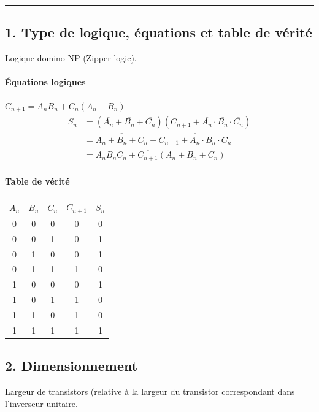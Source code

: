 \documentclass[frenchb,DIV=14]{scrartcl}
\begin{document}
\hspace{1cm}\hrule

\subsection*{1. Type de logique, équations et table de vérité}

Logique domino NP (Zipper logic).

\paragraph{Équations logiques}
$C_{n+1} = A_n B_n + C_n (A_n + B_n)$
\begin{align*}
    S_n &= \overline{(\overline{A_n} + \overline{B_n} + \overline{C_n})(C_{n+1} + \overline{A_n}\cdot\overline{B_n}\cdot\overline{C_n})} \\
    &=  \overline{\overline{A_n}+\overline{B_n}+\overline{C_n}} + \overline{C_{n+1} + \overline{A_n}\cdot\overline{B_n}\cdot\overline{C_n}} \\
    &= A_n B_n C_n + \overline{C_{n+1}}(A_n+B_n+C_n)
\end{align*}

\paragraph{Table de vérité}

\begin{center}
    \begin{tabular}{ccc|cc}
        $A_n$&$B_n$&$C_n$&$C_{n+1}$&$S_n$\\
        \hline
        0&0&0&0&0\\
        0&0&1&0&1\\
        0&1&0&0&1\\
        0&1&1&1&0\\
        1&0&0&0&1\\
        1&0&1&1&0\\
        1&1&0&1&0\\
        1&1&1&1&1
    \end{tabular}
\end{center}

\subsection*{2. Dimensionnement}

Largeur de transistors (relative à la largeur du transistor correspondant
dans l'inverseur unitaire.
\end{document}
